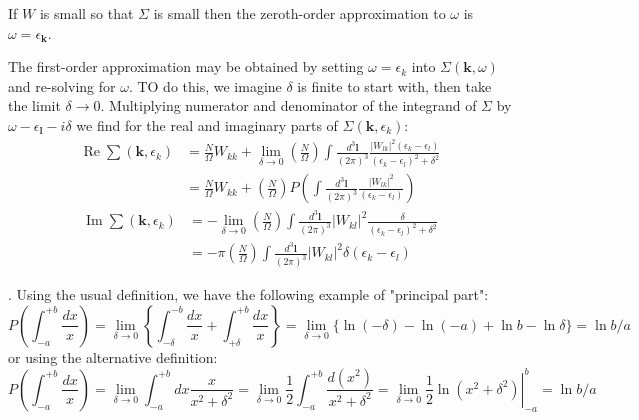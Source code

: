 \begin{imp}
If $W$ is small so that $\Sigma$ is small then the zeroth-order approximation to $\omega$ is $\omega=\epsilon_{\mathbf{k}}$. 

The first-order approximation may be obtained by setting $\omega=\epsilon_k$ into $\Sigma(\mathbf{k},\omega)$ and re-solving for $\omega$. TO do this, we imagine $\delta$ is finite to start with, then take the limit $\delta\rightarrow0$. Multiplying numerator and denominator of the integrand of $\Sigma$ by $\omega-\epsilon_{\mathbf{l}}-i\delta$ we find for the real and imaginary parts of $\Sigma(\mathbf{k},\epsilon_{k})$:
\begin{equation}\begin{aligned}
\operatorname{Re} \sum\left(\mathbf{k}, \epsilon_{k}\right) &=\frac{N}{\Omega} W_{k k}+\lim _{\delta \rightarrow 0}\left(\frac{N}{\Omega}\right) \int \frac{d^{3} \mathbf{l}}{(2 \pi)^{3}} \frac{\left|W_{l k}\right|^{2}\left(\epsilon_{k}-\epsilon_{l}\right)}{\left(\epsilon_{k}-\epsilon_{l}\right)^{2}+\delta^{2}} \\
&=\frac{N}{\Omega} W_{k k}+\left(\frac{N}{\Omega}\right) P\left( \int \frac{d^{3} \mathbf{l}}{(2 \pi)^{3}} \frac{\left|W_{l k}\right|^{2}}{\left(\epsilon_{k}-\epsilon_{l}\right)}\right)
\end{aligned}
\label{real-sigma}
\end{equation}
\begin{equation}\begin{aligned}
\operatorname{Im} \sum\left(\mathbf{k}, \epsilon_{k}\right) &=-\lim _{\delta \rightarrow 0}\left(\frac{N}{\Omega}\right) \int \frac{d^{3} \mathbf{l}}{(2 \pi)^{3}}\left|W_{kl}\right|^{2} \frac{\delta}{\left(\epsilon_{k}-\epsilon_{l}\right)^{2}+\delta^{2}} \\
&=-\pi\left(\frac{N}{\Omega}\right) \int \frac{d^{3} \mathbf{l}}{(2 \pi)^{3}}\left|W_{kl}\right|^{2} \delta\left(\epsilon_{k}-\epsilon_{l}\right)
\end{aligned}
\label{imaginary-sigma}
\end{equation}
\end{imp}
. Using the usual definition, we have the following example of "principal part":
$$P \left(\int_{-a}^{+b} \frac{d x}{x}\right)=\lim _{\delta \rightarrow 0}\left\{\int_{-\delta}^{-b} \frac{d x}{x}+\int_{+\delta}^{+b} \frac{d x}{x}\right\}=\lim _{\delta \rightarrow 0}\{\ln (-\delta)-\ln (-a)+\ln b-\ln \delta\}=\ln b / a$$
or using the alternative definition:
$$P (\int_{-a}^{+b} \frac{d x}{x})=\lim _{\delta \rightarrow 0} \int_{-a}^{+b} d x \frac{x}{x^{2}+\delta^{2}}=\lim _{\delta \rightarrow 0} \frac{1}{2} \int_{-a}^{+b} \frac{d\left(x^{2}\right)}{x^{2}+\delta^{2}}=\left.\lim _{\delta \rightarrow 0} \frac{1}{2} \ln \left(x^{2}+\delta^{2}\right)\right|_{-a} ^{b}=\ln b / a$$
